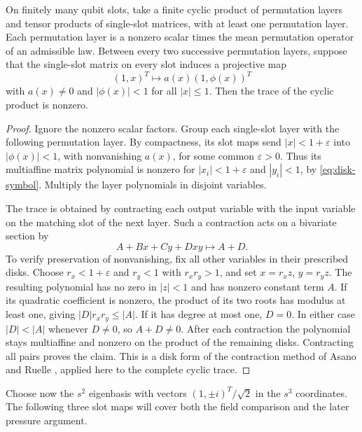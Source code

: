 \begin{lemma}\label{lem:trace-zero-free}
On finitely many qubit slots, take a finite cyclic product of
permutation layers and tensor products of single-slot matrices,
with at least one permutation layer.
Each permutation layer is a nonzero scalar times the mean permutation
operator of an admissible law.  Between every two successive
permutation layers, suppose that the single-slot matrix on every slot
induces a projective map
\[
         (1,x)^T\longmapsto a(x)(1,\phi(x))^T
\]
with $a(x)\ne0$ and $|\phi(x)|<1$ for all $|x|\le1$.
Then the trace of the cyclic product is nonzero.
\end{lemma}

\begin{proof}
Ignore the nonzero scalar factors.  Group each single-slot layer with
the following permutation layer.  By compactness, its slot maps send
$|x|<1+\varepsilon$ into $|\phi(x)|<1$, with nonvanishing $a(x)$,
for some common $\varepsilon>0$.  Thus its multiaffine matrix
polynomial is nonzero for $|x_i|<1+\varepsilon$ and $|y_i|<1$,
by \eqref{eq:disk-symbol}.  Multiply the layer polynomials in disjoint
variables.

The trace is obtained by contracting each output variable with the
input variable on the matching slot of the next layer.  Such a
contraction acts on a bivariate section by
\begin{equation}\label{eq:trace-contraction}
                  A+Bx+Cy+Dxy\longmapsto A+D.
\end{equation}
To verify preservation of nonvanishing, fix all other variables in
their prescribed disks.  Choose $r_x<1+\varepsilon$ and $r_y<1$
with $r_xr_y>1$, and set $x=r_xz$, $y=r_yz$.  The resulting
polynomial has no zero in $|z|<1$ and has nonzero constant term $A$.
If its quadratic coefficient is nonzero, the product of its two
roots has modulus at least one, giving
$|D|r_xr_y\le|A|$.  If it has degree at most one, $D=0$.
In either case $|D|<|A|$ whenever $D\ne0$, so $A+D\ne0$.
After each contraction the polynomial stays multiaffine and nonzero
on the product of the remaining disks.  Contracting all pairs proves
the claim.  This is a disk form of the contraction method of
Asano and Ruelle \cite{Asano1970,Ruelle1971}, applied here to the
complete cyclic trace.
\end{proof}

Choose now the $s^2$ eigenbasis with vectors
$(1,\pm i)^T/\sqrt2$ in the $s^3$ coordinates.  The following
three slot maps will cover both the field comparison and the later
pressure argument.


